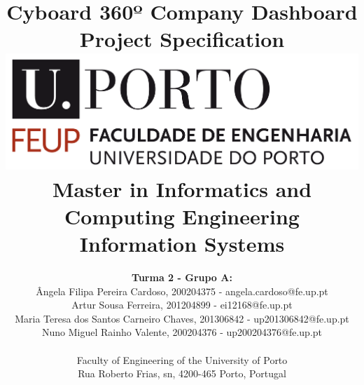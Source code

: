\documentclass[a4paper]{article}
\begin{document}

\title{\Huge\textbf{Cyboard}\linebreak\linebreak
  \Large\textbf{360º Company Dashboard}\linebreak\linebreak
  \large\textbf{Project Specification}\linebreak
  \linebreak\linebreak
  \includegraphics[scale=0.1]{imgs/feup_logo.png}\linebreak\linebreak
  \linebreak\linebreak
  \Large{Master in Informatics and Computing Engineering} \linebreak\linebreak
  \Large{Information Systems}\linebreak
}

\author{\textbf{Turma 2 - Grupo A:}\\
  Ângela Filipa Pereira Cardoso, 200204375 - angela.cardoso@fe.up.pt \\
  Artur Sousa Ferreira, 201204899 - ei12168@fe.up.pt\\
  Maria Teresa dos Santos Carneiro Chaves, 201306842 - up201306842@fe.up.pt \\
  Nuno Miguel Rainho Valente, 200204376 - up200204376@fe.up.pt \\\vspace{1cm}
  \linebreak\linebreak\linebreak\linebreak\\
  Faculty of Engineering of the University of Porto \\ Rua Roberto Frias, s\/n, 4200-465 Porto, Portugal 
  \linebreak\linebreak\linebreak
  \linebreak\linebreak\vspace{1cm}
}
\end{document}
